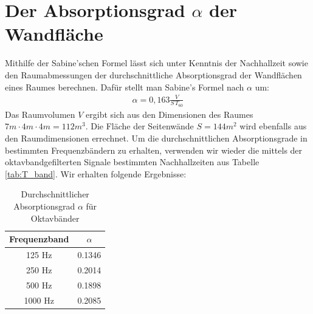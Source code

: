 \section{Der Absorptionsgrad \boldmath$\alpha$ der Wandfläche}
\label{sec:alpha}
Mithilfe der Sabine'schen Formel lässt sich unter Kenntnis der Nachhallzeit sowie den Raumabmessungen der durchschnittliche Absorptionsgrad der Wandflächen eines Raumes berechnen. 
Dafür stellt man Sabine's Formel nach $\alpha$ um:
\begin{align*}
\alpha = 0,163 \frac{V}{S\,T_{60}}
\end{align*}
Das Raumvolumen $V$ ergibt sich aus den Dimensionen des Raumes $7m \cdot 4m \cdot 4m = 112m^3$.
Die Fläche der Seitenwände $S = 144m^2$ wird ebenfalls aus den Raumdimensionen errechnet.
Um die durchschnittlichen Absorptionsgrade in bestimmten Frequenzbändern zu erhalten, verwenden wir wieder die mittels der oktavbandgefilterten Signale bestimmten Nachhallzeiten aus Tabelle \ref{tab:T_band}.
Wir erhalten folgende Ergebnisse:
\begin{table}[H]
    \centering
    \caption{Durchschnittlicher Absorptionsgrad $\alpha$ für Oktavbänder}
    \label{tab:alpha}
    \begin{tabular}[\textwidth]{|c|c|}
    \hline
        Frequenzband &  $\alpha$\\
        \hline
        125 Hz & 0.1346 \\
        250 Hz & 0.2014 \\
        500 Hz & 0.1898 \\
        1000 Hz & 0.2085 \\
        \hline
    \end{tabular}
\end{table}


